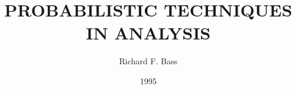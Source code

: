 \documentclass[openany,10pt]{book}
\begin{document}
\frontmatter
\frontmatterstyle
\title{\textsf{PROBABILISTIC TECHNIQUES IN ANALYSIS}}
\author{\textsf{Richard F. Bass}}
\date{\textsf{1995}}
\maketitle




\hidechapterpagenumber

\hypertarget{contents}{}
\tableofcontents

\mainmatter
\mainmatterstyle







\setcounter{chapter}{0}
\backmatterstyle
\showchapterpagenumber

{}
\printbibliography

\printindex
\end{document}

